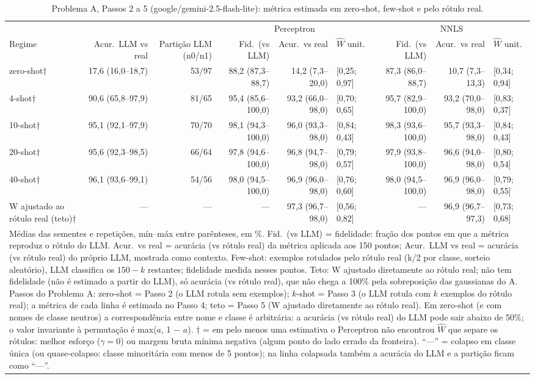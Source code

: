 \begin{table}[htbp]
\centering
\small
\caption{Problema A, Passos 2 a 5 (google/gemini-2.5-flash-lite): métrica estimada em zero-shot, few-shot e pelo rótulo real.}
\label{tab:A_passos_2_a_5_flashlite}
\begin{tabular}{lrrrrlrrl}
\toprule
 &  &  & \multicolumn{3}{c}{Perceptron} & \multicolumn{3}{c}{NNLS} \\ \cmidrule(lr){4-6} \cmidrule(lr){7-9}
Regime & Acur.\ LLM vs real & Partição LLM (n0/n1) & Fid.\ (vs LLM) & Acur.\ vs real & $\hat{W}$ unit. & Fid.\ (vs LLM) & Acur.\ vs real & $\hat{W}$ unit. \\
\midrule
zero-shot† & 17,6 (16,0–18,7) & 53/97 & 88,2 (87,3–88,7) & 14,2 (7,3–20,0) & [0,25; 0,97] & 87,3 (86,0–88,7) & 10,7 (7,3–13,3) & [0,34; 0,94] \\
4-shot† & 90,6 (65,8–97,9) & 81/65 & 95,4 (85,6–100,0) & 93,2 (66,0–98,0) & [0,70; 0,65] & 95,7 (82,9–100,0) & 93,2 (70,0–98,0) & [0,83; 0,37] \\
10-shot† & 95,1 (92,1–97,9) & 70/70 & 98,1 (94,3–100,0) & 96,0 (93,3–98,0) & [0,84; 0,43] & 98,3 (93,6–100,0) & 95,7 (93,3–98,0) & [0,84; 0,43] \\
20-shot† & 95,6 (92,3–98,5) & 66/64 & 97,8 (94,6–100,0) & 96,8 (94,7–98,0) & [0,79; 0,57] & 97,9 (93,8–100,0) & 96,6 (94,0–98,0) & [0,80; 0,54] \\
40-shot† & 96,1 (93,6–99,1) & 54/56 & 98,0 (94,5–100,0) & 96,9 (96,0–98,0) & [0,76; 0,60] & 98,0 (94,5–100,0) & 96,9 (96,0–98,0) & [0,79; 0,55] \\
\midrule
W ajustado ao rótulo real (teto)† & — & — & — & 97,3 (96,7–98,0) & [0,56; 0,82] & — & 96,9 (96,7–97,3) & [0,73; 0,68] \\
\bottomrule
\multicolumn{9}{p{0.95\linewidth}}{\footnotesize Médias das sementes e repetições, mín–máx entre parênteses, em \%. Fid.\ (vs LLM) = fidelidade: fração dos pontos em que a métrica reproduz o rótulo do LLM. Acur.\ vs real = acurácia (vs rótulo real) da métrica aplicada aos 150 pontos; Acur.\ LLM vs real = acurácia (vs rótulo real) do próprio LLM, mostrada como contexto. Few-shot: exemplos rotulados pelo rótulo real (k/2 por classe, sorteio aleatório), LLM classifica os $150-k$ restantes; fidelidade medida nesses pontos. Teto: W ajustado diretamente ao rótulo real; não tem fidelidade (não é estimado a partir do LLM), só acurácia (vs rótulo real), que não chega a 100\% pela sobreposição das gaussianas do A. Passos do Problema A: zero-shot = Passo 2 (o LLM rotula sem exemplos); $k$-shot = Passo 3 (o LLM rotula com $k$ exemplos do rótulo real); a métrica de cada linha é estimada no Passo 4; teto = Passo 5 (W ajustado diretamente ao rótulo real). Em zero-shot (e com nomes de classe neutros) a correspondência entre nome e classe é arbitrária: a acurácia (vs rótulo real) do LLM pode sair abaixo de 50\%; o valor invariante à permutação é max($a$, 1 $-$ $a$). † = em pelo menos uma estimativa o Perceptron não encontrou $\hat{W}$ que separe os rótulos: melhor esforço ($\gamma = 0$) ou margem bruta mínima negativa (algum ponto do lado errado da fronteira). ``—'' = colapso em classe única (ou quase-colapso: classe minoritária com menos de 5 pontos); na linha colapsada também a acurácia do LLM e a partição ficam como ``—''.} \\

\end{tabular}
\end{table}
